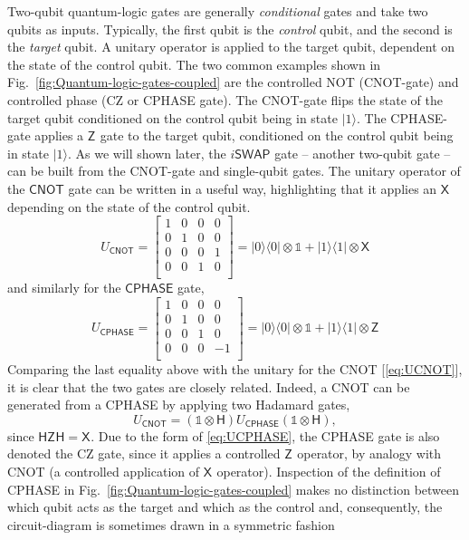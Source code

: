 \documentclass[aip,apr,twocolumn,showpacs,superscriptaddress,groupedaddress,nofootinbib,reprint]{revtex4-1}  %
\newcommand{\Id}{\mathds{1}}
\newcommand{\X}[1]{\textsf{X}_{#1}}
\newcommand{\Z}[1]{\textsf{Z}_{#1}}
\renewcommand{\H}{\textsf{H}}
\newcommand{\CNOT}{\textsf{CNOT}}
\newcommand{\CPHASE}{\textsf{CPHASE}}
\newcommand{\CZ}{\textsf{CZ}}
\begin{document}
Two-qubit quantum-logic gates are generally \textit{conditional} gates and take two qubits as inputs. Typically, the first qubit is the \textit{control} qubit, and the second is the \textit{target} qubit. A unitary operator is applied to the target qubit, dependent on the state of the control qubit. The two common examples shown in Fig.~\ref{fig:Quantum-logic-gates-coupled} are the controlled NOT (\CNOT{}-gate) and controlled phase (\textsf{CZ} or \CPHASE{} gate). The \CNOT{}-gate flips the state of the target qubit conditioned on the control qubit being in state $\vert 1 \rangle$. The \CPHASE-gate applies a $\Z{}$ gate to the target qubit, conditioned on the control qubit being in state $\vert 1 \rangle$. As we will shown later, the $i\textsf{SWAP}$ gate -- another two-qubit gate -- can be built from the \textsf{CNOT}-gate and single-qubit gates.
\newpage
The unitary operator of the $\CNOT{}$ gate can be written in a useful way, highlighting that it applies an $\X{}$ depending on the state of the control qubit.
\begin{equation}
U_\CNOT{} =
\begin{bmatrix}
1 & 0 & 0 & 0 \\
0 & 1 & 0 & 0 \\
0 & 0 & 0 & 1 \\
0 & 0 & 1 & 0 \\
\end{bmatrix} = |0\rangle\langle  0| \otimes \mathds{1} + |1\rangle\langle 1| \otimes \X{} \label{eq:UCNOT}
\end{equation}
and similarly for the $\CPHASE{}$ gate,
\begin{equation}
U_\CPHASE{} =
\begin{bmatrix}
1 & 0 & 0 & 0 \\
0 & 1 & 0 & 0 \\
0 & 0 & 1 & 0 \\
0 & 0 & 0 & -1 \\
\end{bmatrix} = |0\rangle\langle  0| \otimes \mathds{1} + |1\rangle\langle 1| \otimes \Z{}
\label{eq:UCPHASE}
\end{equation}
Comparing the last equality above with the unitary for the \CNOT{} [\cref{eq:UCNOT}], it is clear that the two gates are closely related. Indeed, a \CNOT{} can be generated from a \CPHASE{} by applying two Hadamard gates,
\begin{equation}
U_\CNOT{} = (\Id \otimes \H{})U_\CPHASE(\Id \otimes \H{}),
\end{equation}
since $\H{}\Z{}\H{} = \X{}$. Due to the form of \cref{eq:UCPHASE}, the \CPHASE{} gate is also denoted the \CZ{} gate, since it applies a controlled $\Z{}$ operator, by analogy with \CNOT{} (a controlled application of $\X{}$ operator). Inspection of the definition of \CPHASE{} in Fig.~\ref{fig:Quantum-logic-gates-coupled} makes no distinction between which qubit acts as the target and which as the control and, consequently, the circuit-diagram is sometimes drawn in a symmetric fashion
\end{document}

